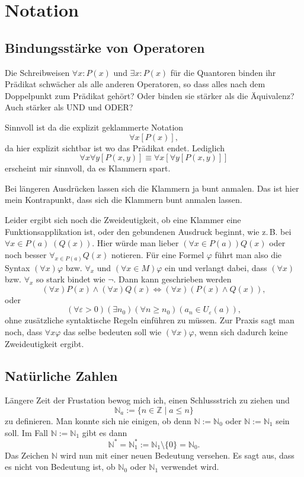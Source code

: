 \documentclass[a4paper,11pt,fleqn]{article}
\newcommand{\N}{\mathbb N}
\newcommand{\Z}{\mathbb Z}
\begin{document}
\section{Notation}
\subsection{Bindungsstärke von Operatoren}
Die Schreibweisen $\forall x\colon P(x)$ und $\exists x\colon P(x)$
für die Quantoren binden ihr Prädikat schwächer als alle anderen
Operatoren, so dass alles nach dem Doppelpunkt zum Prädikat gehört?
Oder binden sie stärker als die Äquivalenz? Auch stärker als UND und
ODER?

Sinnvoll ist da die explizit geklammerte Notation
\begin{equation}
\forall x[P(x)],
\end{equation}
da hier explizit sichtbar ist wo das Prädikat endet. Lediglich
\begin{equation}
\forall x\forall y [P(x,y)] \equiv \forall x[\forall y[P(x,y)]]
\end{equation}
erscheint mir sinnvoll, da es Klammern spart.

Bei längeren Ausdrücken lassen sich die Klammern ja bunt anmalen.
Das ist hier mein Kontrapunkt, dass sich die Klammern bunt
anmalen lassen.

Leider ergibt sich noch die Zweideutigkeit, ob eine Klammer eine
Funktionsapplikation ist, oder den gebundenen Ausdruck beginnt,
wie z.\,B. bei $\forall x{\in}P(a)\;(Q(x))$. Hier würde man lieber
$(\forall x{\in}P(a))Q(x)$ oder noch besser $\forall_{x\in P(a)} Q(x)$
notieren. Für eine Formel $\varphi$
führt man also die Syntax $(\forall x)\varphi$ bzw. $\forall_x$ und
$(\forall x{\in}M)\varphi$ ein und verlangt dabei, dass $(\forall x)$
bzw. $\forall_x$ so stark bindet wie $\neg$. Dann kann geschrieben werden
\[(\forall x)P(x)\land (\forall x)Q(x) \iff (\forall x)(P(x)\land Q(x)),\]
oder
\[(\forall\varepsilon{>}0)(\exists n_0)(\forall n{\ge}n_0)(a_n\in U_\varepsilon(a)),\]
ohne zusätzliche syntaktische Regeln einführen zu müssen.
Zur Praxis sagt man noch, dass $\forall x\varphi$ das selbe bedeuten
soll wie $(\forall x)\varphi$, wenn sich dadurch keine Zweideutigkeit
ergibt.

\subsection{Natürliche Zahlen}
Längere Zeit der Frustation bewog mich ich, einen Schlussstrich
zu ziehen und
\begin{equation}
\N_a := \{n\in\Z\mid a\le n\}
\end{equation}
zu definieren. Man konnte sich nie einigen, ob denn
$\N:=\N_0$ oder $\N:=\N_1$ sein soll. Im Fall $\N:=\N_1$
gibt es dann
\begin{equation}
\N^\ast = \N_1^\ast := \N_1\setminus\{0\} = \N_0.
\end{equation}
Das Zeichen $\N$ wird nun mit einer neuen Bedeutung versehen.
Es sagt aus, dass es nicht von Bedeutung ist, ob $\N_0$ oder $\N_1$
verwendet wird.
\end{document}
